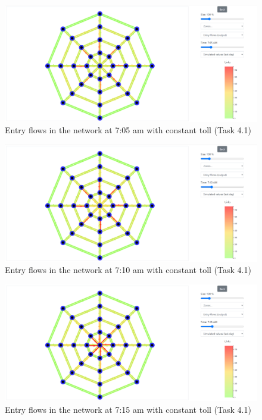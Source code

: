 \documentclass[a4paper, 12pt,oneside]{article}
\begin{document}
\begin{minipage}[c]{0.5\textwidth}
\begin{figure}[H]
    \centering
    \includegraphics[width=1\textwidth]{Images/Step4/results_on_network__task4.1_705am.png}
    \caption{Entry flows in the network at 7:05 am with constant toll (Task 4.1)}
    \label{fig:Entry flows in the network at 7:05 am with constant toll (Task 4.1)}
\end{figure}
\end{minipage}
\begin{minipage}[c]{0.5\textwidth}
\begin{figure}[H]
    \centering
    \includegraphics[width=1\textwidth]{Images/Step4/results_on_network__task4.1_710am.png}
    \caption{Entry flows in the network at 7:10 am with constant toll (Task 4.1)}
    \label{fig:Entry flows in the network at 7:10 am with constant toll (Task 4.1)}
\end{figure}
\end{minipage}
\begin{minipage}[c]{0.5\textwidth}
\begin{figure}[H]
    \centering
    \includegraphics[width=1\textwidth]{Images/Step4/results_on_network__task4.1_715am.png}
    \caption{Entry flows in the network at 7:15 am with constant toll (Task 4.1)}
    \label{fig:Entry flows in the network at 7:15 am with constant toll (Task 4.1)}
\end{figure}
\end{minipage}
\end{document}
